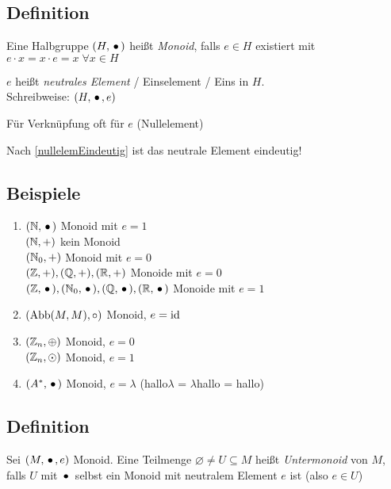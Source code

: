  
 \subsection{Definition}
 
 Eine Halbgruppe $(H, \,{\bullet}\,)$ heißt \emph{Monoid}, falls $e \in H$ existiert mit $e\cdot x = x \cdot e = x \; \forall x \in H$
 
 $e$ heißt \emph{neutrales Element} / Einselement / Eins in $H$.
 \\Schreibweise: $(H, \,{\bullet}\,, e)$
 
 Für  Verknüpfung oft  für $e$ (Nullelement)
 
 Nach \ref{nullelemEindeutig} ist das neutrale Element eindeutig!
 
 \subsection{Beispiele}
 
 \begin{enumerate}

	\item
	$(\mathbb{N}, \,{\bullet}\,)$ Monoid mit $e=1$
	\\$(\mathbb{N}, +)$ kein Monoid
	\\$(\mathbb{N}_0, +)$ Monoid mit $e=0$
	\\$(\mathbb{Z}, +), (\mathbb{Q}, +), (\mathbb{R}, +)$ Monoide mit $e=0$
	\\$(\mathbb{Z}, \,{\bullet}\,), (\mathbb{N}_0, \,{\bullet}\,), (\mathbb{Q}, \,{\bullet}\,), (\mathbb{R}, \,{\bullet}\,)$ Monoide mit $e=1$
	
	\item
	$(\mathrm{Abb}(M, M), \circ)$ Monoid, $e = \mathrm{id}$
	
	\item
	$(\mathbb{Z}_n, \oplus)$ Monoid, $e=0$
	\\ $(\mathbb{Z}_n, \odot)$ Monoid, $e=1$
	
	\item
	$(A^*, \,{\bullet}\,)$ Monoid, $e= \lambda$ (hallo$\lambda$ = $\lambda$hallo = hallo)

 \end{enumerate}
 
 \subsection{Definition}
 
 Sei $(M, \,{\bullet}\,, e)$ Monoid. Eine Teilmenge $\varnothing \neq U \subseteq M$ heißt \emph{Untermonoid} von $M$, falls $U$ mit $\,{\bullet}\,$ selbst ein Monoid mit neutralem Element $e$ ist (also $e \in U$)

